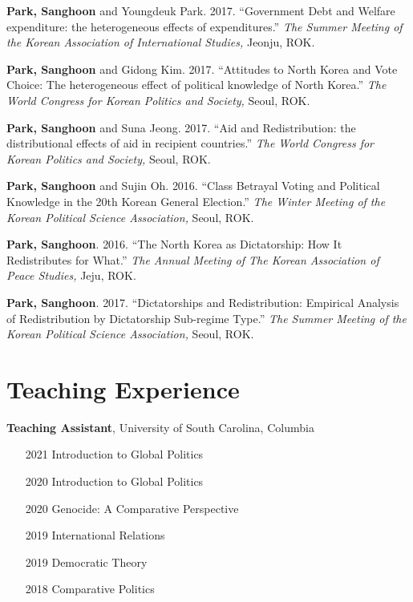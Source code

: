 \documentclass[margin,line]{res}
\begin{document}
\begin{resume}
\vspace{-.25cm}
{\bf Park, Sanghoon} and Youngdeuk Park. {2017.} {``Government Debt and Welfare expenditure: the heterogeneous effects of expenditures.''} {\it The Summer Meeting of the Korean Association of International Studies,} Jeonju, ROK.

\vspace{-.25cm}
{\bf Park, Sanghoon} and Gidong Kim. {2017.} {``Attitudes to North Korea and Vote Choice: The heterogeneous effect of political knowledge of North Korea.''} {\it The World Congress for Korean Politics and Society,} Seoul, ROK.

\vspace{-.25cm}
{\bf Park, Sanghoon} and Suna Jeong. {2017.} {``Aid and Redistribution: the distributional effects of aid in recipient countries.''} {\it The World Congress for Korean Politics and Society,} Seoul, ROK.

\vspace{-.25cm}
{\bf Park, Sanghoon} and Sujin Oh. {2016.} {``Class Betrayal Voting and Political Knowledge in the 20th Korean General Election.''} {\it The Winter Meeting of the Korean Political Science Association,} Seoul, ROK.

\vspace{-.25cm}
{\bf Park, Sanghoon}. {2016.} {``The North Korea as Dictatorship: How It Redistributes for What.''} {\it The Annual Meeting of The Korean Association of Peace Studies,} Jeju, ROK.

\vspace{-.25cm}
{\bf Park, Sanghoon}. {2017.} {``Dictatorships and Redistribution: Empirical Analysis of Redistribution by Dictatorship Sub-regime Type.''} {\it The Summer Meeting of the Korean Political Science Association,} Seoul, ROK.

\section{\sc Teaching Experience}

{\bf Teaching Assistant}, University of South Carolina, Columbia

\begin{itemize} \itemsep -1mm 
	\item[2021] Introduction to Global Politics
	\item[2020] Introduction to Global Politics
	\item[2020] Genocide: A Comparative Perspective
	\item[2019] International Relations
	\item[2019] Democratic Theory
	\item[2018] Comparative Politics
\end{itemize}


\end{resume}
\end{document}
